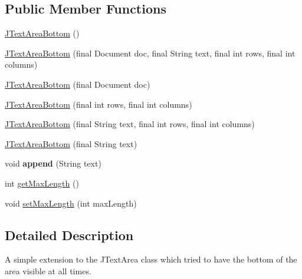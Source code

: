 \subsection*{Public Member Functions}
\begin{DoxyCompactItemize}
\item 
\hyperlink{classgov_1_1fnal_1_1ppd_1_1dd_1_1util_1_1JTextAreaBottom_a8ef63446bbf050fc3e0befd1978e0d1a}{J\-Text\-Area\-Bottom} ()
\item 
\hyperlink{classgov_1_1fnal_1_1ppd_1_1dd_1_1util_1_1JTextAreaBottom_ad837bb4b22ba98b7664fbd9d70a3e7d0}{J\-Text\-Area\-Bottom} (final Document doc, final String text, final int rows, final int columns)
\item 
\hyperlink{classgov_1_1fnal_1_1ppd_1_1dd_1_1util_1_1JTextAreaBottom_a649ca51be0f9fa14b733f94854b696ed}{J\-Text\-Area\-Bottom} (final Document doc)
\item 
\hyperlink{classgov_1_1fnal_1_1ppd_1_1dd_1_1util_1_1JTextAreaBottom_aa95475b0e2c11a17cd19b03c6d0c2b1e}{J\-Text\-Area\-Bottom} (final int rows, final int columns)
\item 
\hyperlink{classgov_1_1fnal_1_1ppd_1_1dd_1_1util_1_1JTextAreaBottom_a096c66d8d188af90295b4142a484ee74}{J\-Text\-Area\-Bottom} (final String text, final int rows, final int columns)
\item 
\hyperlink{classgov_1_1fnal_1_1ppd_1_1dd_1_1util_1_1JTextAreaBottom_a6bfb990c4ecb4dce347a73e08ac226a3}{J\-Text\-Area\-Bottom} (final String text)
\item 
\hypertarget{classgov_1_1fnal_1_1ppd_1_1dd_1_1util_1_1JTextAreaBottom_a07de6bfc1427baef9ab2710999a8cd07}{void {\bfseries append} (String text)}\label{classgov_1_1fnal_1_1ppd_1_1dd_1_1util_1_1JTextAreaBottom_a07de6bfc1427baef9ab2710999a8cd07}

\item 
int \hyperlink{classgov_1_1fnal_1_1ppd_1_1dd_1_1util_1_1JTextAreaBottom_a9e58641bde331da6bb9bb246b87bdc42}{get\-Max\-Length} ()
\item 
void \hyperlink{classgov_1_1fnal_1_1ppd_1_1dd_1_1util_1_1JTextAreaBottom_a31093b799625b0aa5a264be451af489e}{set\-Max\-Length} (int max\-Length)
\end{DoxyCompactItemize}


\subsection{Detailed Description}
A simple extension to the J\-Text\-Area class which tried to have the bottom of the area visible at all times.

